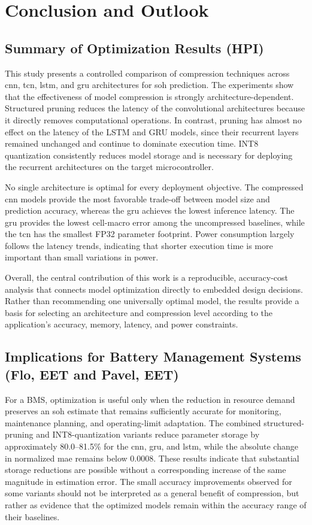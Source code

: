 \documentclass[final,3p,times]{elsarticle}
\begin{document}
\section{Conclusion and Outlook}

\subsection{Summary of Optimization Results (HPI)}

This study presents a controlled comparison of compression techniques across \ac{cnn}, \ac{tcn}, \ac{lstm}, and \ac{gru} architectures for \ac{soh} prediction. The experiments show that the effectiveness of model compression is strongly architecture-dependent. Structured pruning reduces the latency of the convolutional architectures because it directly removes computational
operations. In contrast, pruning has almost no effect on the latency of the
LSTM and GRU models, since their recurrent layers remained unchanged and
continue to dominate execution time. INT8 quantization consistently reduces
model storage and is necessary for deploying the recurrent architectures on
the target microcontroller.

No single architecture is optimal for every deployment objective. The
compressed \ac{cnn} models provide the most favorable trade-off between model size
and prediction accuracy, whereas the \ac{gru} achieves the lowest inference
latency. The \ac{gru} provides the lowest cell-macro error among the uncompressed baselines, while the \ac{tcn} has the smallest FP32 parameter footprint. Power consumption largely
follows the latency trends, indicating that shorter execution time is more
important than small variations in power.

Overall, the central contribution of this work is a reproducible, accuracy-cost analysis that connects model optimization directly to embedded design decisions. Rather than recommending one universally optimal model, the results provide a basis for selecting an architecture and
compression level according to the application's accuracy, memory, latency,
and power constraints.

\subsection{Implications for Battery Management Systems (Flo, EET and Pavel, EET)}
For a BMS, optimization is useful only when the reduction in resource demand preserves an \ac{soh} estimate that remains sufficiently accurate for monitoring, maintenance planning, and operating-limit adaptation. The combined structured-pruning and INT8-quantization variants reduce parameter storage by approximately 80.0--81.5\% for the \ac{cnn}, \ac{gru}, and \ac{lstm}, while the absolute change in normalized \ac{mae} remains below 0.0008. These results indicate that substantial storage reductions are possible without a corresponding increase of the same magnitude in estimation error. The small accuracy improvements observed for some variants should not be interpreted as a general benefit of compression, but rather as evidence that the optimized models remain within the accuracy range of their baselines.
\end{document}
